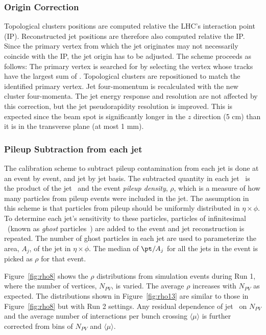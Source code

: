\subsubsection{Origin Correction}
\label{sec:orCorr}
\par Topological clusters positions are computed relative the LHC's interaction point (IP).
Reconstructed jet positions are therefore also computed relative the IP.
Since the primary vertex from which the jet originates may not necessarily 
coincide with the IP, the jet origin has to be adjusted. The scheme proceeds as 
follows: The primary vertex is searched for by selecting the vertex whose 
tracks have the largest sum of \pt. Topological clusters are repositioned to match the 
identified primary vertex. Jet four-momentum is recalculated with the new cluster 
four-momenta. The jet energy response and resolution are not affected by this correction, 
but the jet pseudorapidity resolution is improved. This is expected since the beam spot 
is significantly longer in the $z$ direction (5 cm) than it is in the transverse plane (at most 1 mm). 

\subsubsection{Pileup Subtraction from each jet}
\label{sec:ghosts}
\par The calibration scheme to subtract pileup contamination from each jet is done 
at an event by event, and jet by jet basis. The subtracted quantity in each jet \pt\  
is the product of the jet \pt\ and the event {\it pileup density}, $\rho$, which 
is a measure of how many particles from pileup events were included in the jet. 
The assumption in this scheme is that particles from pileup should be uniformly 
distributed in $\eta\times\phi$. To determine each jet's sensitivity to these particles, 
particles of infinitesimal \pt\ (known as {\it ghost} particles~\cite{Cacciari:2008gn}) are added to 
the event and jet reconstruction is repeated. The number of ghost particles in each jet are used 
to parameterize the area, $A_{j}$, of the jet in $\eta\times\phi$. The median of $\pt/A_{j}$ for all 
the jets in the event is picked as $\rho$ for that event. 

\par Figure~\ref{fig:rho8} shows the $\rho$ 
distributions from simulation events during Run 1, where the number of vertices, $N_{PV}$, 
is varied. The average $\rho$ increases with $N_{PV}$ as expected. The distributions 
shown in Figure~\ref{fig:rho13} are similar to those in Figure~\ref{fig:rho8} but with Run 2 settings.
Any residual dependence of jet \pt\ on $N_{PV}$ and the average number of interactions 
per bunch crossing $\langle\mu\rangle$ is further corrected from bins of $N_{PV}$ and $\langle\mu\rangle$. 

